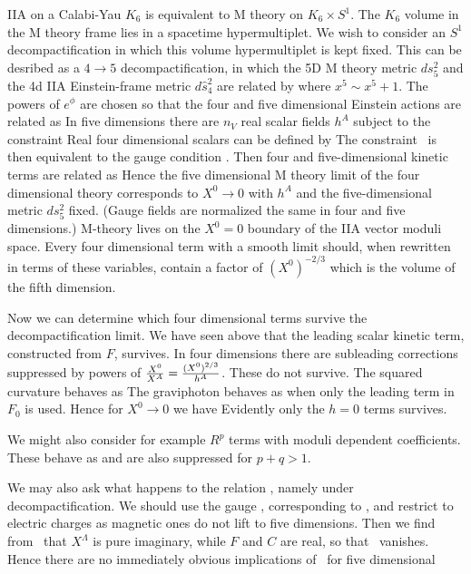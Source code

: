 IIA on a Calabi-Yau $K_6$ is equivalent to M theory on $K_6\times
S^1$. The $K_6$ volume in the M theory frame lies in a spacetime
hypermultiplet. We wish to consider an $S^1$ decompactification in
which this volume hypermultiplet is kept fixed. This can be
desribed as a $4\to 5$ decompactification, in which the 5D M
theory metric $ds_5^2$ and the 4d IIA Einstein-frame metric $d\hat
s_4^2$ are related by \eqn{} where $x^5\sim
x^5+1$. The powers of $e^\phi$ are chosen so that the four and
five dimensional Einstein actions are related  as \eqn{} In five dimensions there are $n_V$ real scalar
fields $h^A$ subject to the constraint
\eqn{} Real four dimensional scalars can be
defined by \eqn{} The constraint \dir\ is then equivalent to the gauge
condition \dft. Then four and  five-dimensional kinetic terms are
related as \eqn{} Hence the five dimensional M
theory limit of the four dimensional theory corresponds to $X^0
\to 0$ with $h^A$ and the five-dimensional metric $ds_5^2$  fixed.
(Gauge fields are normalized the same in four and five
dimensions.) M-theory lives on the $X^0=0$ boundary of the IIA
vector moduli space. Every four dimensional term with a smooth
limit should, when rewritten in terms of these variables, contain
a factor of $(X^0)^{-2/3}$ which is the volume of the fifth
dimension.

Now we can determine which four dimensional terms survive the
decompactification limit. We have seen above that the leading scalar
kinetic term, constructed from $F$,
 survives. In four dimensions there are subleading corrections
suppressed by powers of ${X^0 \over X^A}= {(X^0)^{2/3} \over h^A}$. These do not survive.
The squared curvature behaves as
\eqn{}
The graviphoton behaves as
\eqn{}
when only the leading term in $F_0$ is used.
Hence for $X^0 \to 0$
we have
\eqn{}
Evidently only the $h=0$ terms survives.


We might also consider for example $R^{p}$ terms with moduli dependent
coefficients. These behave as
\eqn{}
and are also suppressed for $p+q>1$.

We may also ask what happens to the relation \dkyr, namely
\eqn{} under decompactification. We
should use the gauge \dft, corresponding to \dir, and restrict to
electric charges as magnetic ones do not lift to five dimensions.
Then we find from \dxz\ that $X^\Lambda$ is pure imaginary,  while
$F$ and $C$ are real, so that \saa\ vanishes. Hence there are no
immediately obvious implications of \fxop\ for five dimensional
